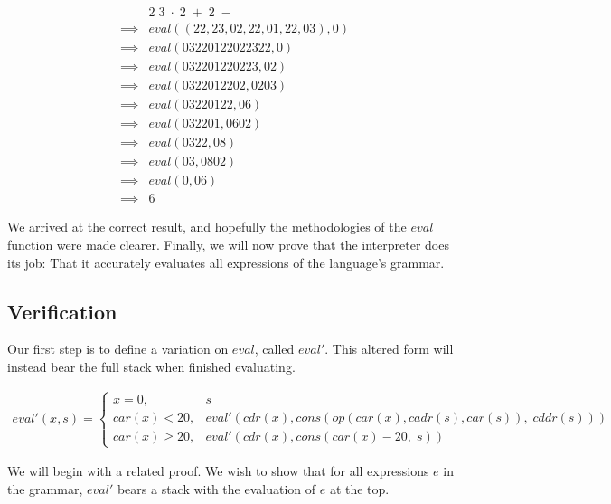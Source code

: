 \documentclass{article}
\begin{document}
\begin{align*}
    &2 \; 3 \; \cdot \; 2 \; + \; 2 \; -
\\  \implies &eval((22, 23, 02, 22, 01, 22, 03), 0)    
\\  \implies &eval(03220122022322, 0)
\\  \implies &eval(032201220223, 02)
\\  \implies &eval(0322012202, 0203)
\\  \implies &eval(03220122, 06)
\\  \implies &eval(032201, 0602)
\\  \implies &eval(0322, 08)
\\  \implies &eval(03, 0802)
\\  \implies &eval(0, 06)
\\  \implies &6
\end{align*}

We arrived at the correct result, and hopefully the methodologies of the $eval$
function were made clearer. Finally, we will now prove that the interpreter
does its job: That it accurately evaluates all expressions of the language's
grammar.

\subsection{Verification}

Our first step is to define a variation on $eval$, called $eval'$.  This
altered form will instead bear the full stack when finished evaluating.

\begin{align*}
eval'(x, s) = \left\{
  \begin{array}{lr}
        x = 0, &s
    \\  car(x) < 20, &eval'(cdr(x), cons(op(car(x), cadr(s), car(s)), \; cddr(s)))
    \\  car(x) \ge 20, &eval'(cdr(x), cons(car(x) - 20, \; s))
  \end{array}
\right.
\end{align*}

We will begin with a related proof. We wish to show that for all expressions
$e$ in the grammar, $eval'$ bears a stack with the evaluation of $e$ at the
top.
\end{document}
